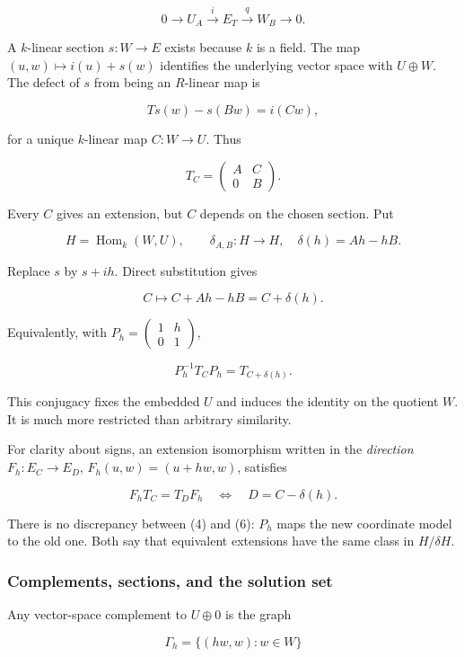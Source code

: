 \documentclass[
  11pt,
]{article}
\begin{document}
\[0\longrightarrow U_A\xrightarrow{i}E_T\xrightarrow{q}W_B
\longrightarrow0.\tag{1}\]

A \(k\)-linear section \(s:W\to E\) exists because \(k\) is a field. The
map \((u,w)\mapsto i(u)+s(w)\) identifies the underlying vector space
with \(U\oplus W\). The defect of \(s\) from being an \(R\)-linear map
is

\[Ts(w)-s(Bw)=i(Cw),\]

for a unique \(k\)-linear map \(C:W\to U\). Thus

\[T_C=\begin{pmatrix}A&C\\0&B\end{pmatrix}.\tag{2}\]

Every \(C\) gives an extension, but \(C\) depends on the chosen section.
Put

\[H=\operatorname{Hom}_k(W,U),\qquad
\delta_{A,B}:H\longrightarrow H,\quad \delta(h)=Ah-hB.\tag{3}\]

Replace \(s\) by \(s+i h\). Direct substitution gives

\[C\longmapsto C+Ah-hB=C+\delta(h).\tag{4}\]

Equivalently, with \(P_h=\begin{pmatrix}1&h\\0&1\end{pmatrix}\),

\[P_h^{-1}T_CP_h=T_{C+\delta(h)}.\tag{5}\]

This conjugacy fixes the embedded \(U\) and induces the identity on the
quotient \(W\). It is much more restricted than arbitrary similarity.

For clarity about signs, an extension isomorphism written in the
\emph{direction} \(F_h:E_C\to E_D\), \(F_h(u,w)=(u+hw,w)\), satisfies

\[F_hT_C=T_DF_h\quad\Longleftrightarrow\quad D=C-\delta(h).\tag{6}\]

There is no discrepancy between (4) and (6): \(P_h\) maps the new
coordinate model to the old one. Both say that equivalent extensions
have the same class in \(H/\delta H\).

\subsubsection{Complements, sections, and the solution
set}\label{complements-sections-and-the-solution-set}

Any vector-space complement to \(U\oplus0\) is the graph

\[\Gamma_h=\{(hw,w):w\in W\}\]
\end{document}
